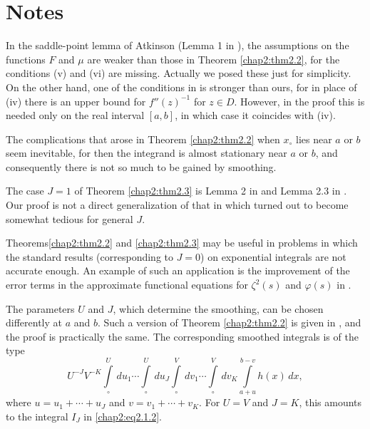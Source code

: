 \bigskip


\section*{Notes}

In the saddle-point lemma of Atkinson (Lemma 1 in \cite{key2}), the
assumptions on the functions $F$ and $\mu$ are weaker than those in
Theorem \ref{chap2:thm2.2}, for the conditions (v) and (vi) are
missing. Actually we posed these just for simplicity. On the other
hand, one of the conditions in  \cite{key2} is stronger than ours, for
in place of (iv) there is an upper bound for $f'' (z)^{-1}$ for $z \in
D$. However, in the proof this is needed only on the real interval $[a,b]$,
in which case it coincides with (iv).

The complications that arose in Theorem \ref{chap2:thm2.2} when
$x_\circ$ lies near $a$ or $b$ seem inevitable, for then the integrand
is almost stationary near $a$ or $b$, and consequently there is not so
much to be gained by smoothing.

The case $J=1$ of Theorem \ref{chap2:thm2.3} is Lemma 2 in
\cite{key16} and Lemma 2.3 in \cite{key13}. Our proof is not a direct
generalization of that in \cite{key16} which turned out to become
somewhat tedious for general $J$.

Theorems\pageoriginale \ref{chap2:thm2.2} and \ref{chap2:thm2.3} may
be useful in problems in which the standard results (corresponding to
$J=0$) on exponential integrals are not accurate enough. An example of
such an application is the improvement of the error terms in the
approximate functional equations for $\zeta^2(s)$ and $\varphi(s)$ in
\cite{key19}. 

The parameters $U$ and $J$, which determine the smoothing, can be
chosen differently at $a$ and $b$. Such a version of Theorem
\ref{chap2:thm2.2} is given in \cite{key19}, and the proof is
practically the same. The corresponding smoothed integrals is of the
type
$$
U^{-J}V^{-K}\int\limits_\circ^U\,du_1\cdots\int\limits_\circ^U\,du_J
\int\limits_\circ^V \,dv_1\cdots\int\limits_\circ^V\,dv_K
\int\limits_{a+u}^{b-v} h(x)\,dx,
$$
where $u=u_1+\cdots+u_J$ and $v=v_1+\cdots+ v_K$. For $U=V$ and $J=K$,
this amounts to the integral $I_J$ in \eqref{chap2:eq2.1.2}. 

